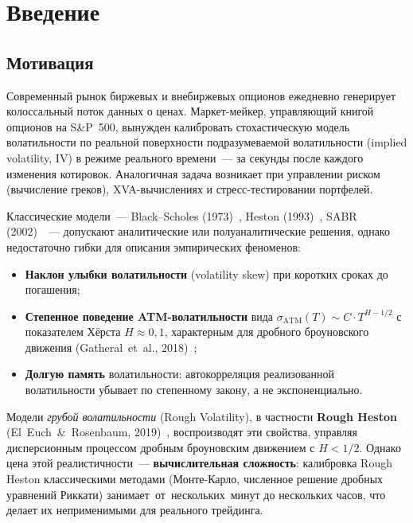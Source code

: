 
\section*{Введение}
\label{sec:intro}

\subsection*{Мотивация}

Современный рынок биржевых и внебиржевых опционов ежедневно генерирует
колоссальный поток данных о ценах. Маркет-мейкер, управляющий книгой
опционов на S\&P~500, вынужден калибровать стохастическую модель волатильности
по реальной поверхности подразумеваемой волатильности (implied volatility, IV)
в режиме реального времени~--- за секунды после каждого изменения котировок.
Аналогичная задача возникает при управлении риском (вычисление греков),
XVA-вычислениях и стресс-тестировании портфелей.

Классические модели~--- Black--Scholes (1973)~\cite{BlackScholes1973},
Heston (1993)~\cite{Heston1993}, SABR (2002)~\cite{Hagan2002}~--- допускают
аналитические или полуаналитические решения, однако недостаточно гибки
для описания эмпирических феноменов:
\begin{itemize}
  \item \textbf{Наклон улыбки волатильности} (volatility skew) при коротких
        сроках до погашения;
  \item \textbf{Степенное поведение ATM-волатильности} вида
        $\sigma_{\mathrm{ATM}}(T) \sim C \cdot T^{H-1/2}$ с показателем
        Хёрста $H \approx 0{,}1$, характерным для дробного броуновского движения
        (Gatheral~et~al., 2018)~\cite{Gatheral2018};
  \item \textbf{Долгую память} волатильности: автокорреляция реализованной
        волатильности убывает по степенному закону, а не экспоненциально.
\end{itemize}

Модели \textit{грубой волатильности} (Rough Volatility), в частности
\textbf{Rough Heston} (El~Euch~\&~Rosenbaum, 2019)~\cite{ElEuch2019},
воспроизводят эти свойства, управляя дисперсионным процессом дробным броуновским
движением с $H < 1/2$. Однако цена этой реалистичности~--- \textbf{вычислительная
сложность}: калибровка Rough Heston классическими методами (Монте-Карло,
численное решение дробных уравнений Риккати) занимает~от~нескольких~минут до
нескольких часов, что делает их неприменимыми для реального трейдинга.

